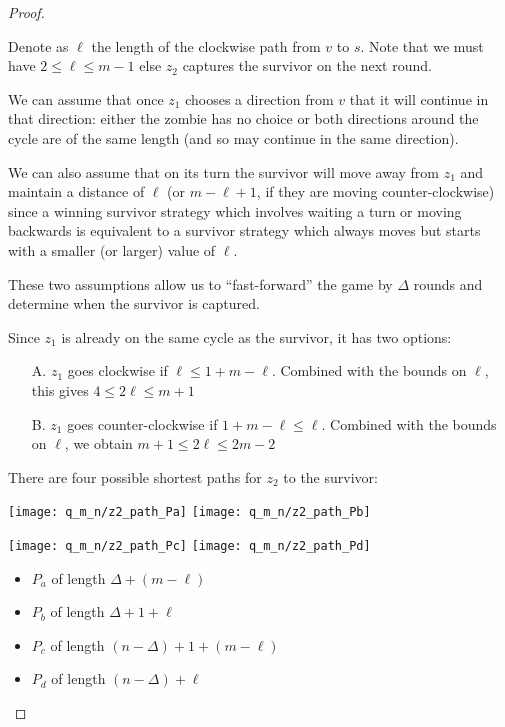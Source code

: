 \begin{proof}
\begin{proofpart}
  Denote as $\ell$ the length of the clockwise
  path from $v$ to $s$. Note that we must have $2 \leq \ell \leq m-1$ else
  $z_2$ captures the survivor on the next round.

  We can assume that once $z_1$ chooses a direction from $v$
  that it will continue in that direction:
  either the zombie has no choice or both directions around
  the cycle are of the same length (and so
  may continue in the same direction).

  We can also assume that on its turn the survivor will move away from
  $z_1$ and maintain a distance of $\ell$ (or $m-\ell +1$, if they are moving counter-clockwise)
  since a winning survivor strategy which involves waiting a turn
  or moving backwards is equivalent to a survivor strategy
  which always moves but starts with a smaller (or larger) value of $\ell$.

  These two assumptions allow us to ``fast-forward'' the game by $\Delta$ rounds
  and determine when the survivor is captured.

  Since $z_1$ is already on the same cycle as the survivor, it has two options:

  \begin{itemize}
   \item[A.] $z_1$ goes clockwise if $\ell \leq 1 + m - \ell$.
         Combined with the bounds on $\ell$, this gives $4 \leq 2 \ell \leq m + 1$

   \item[B.] $z_1$ goes counter-clockwise if $1 + m - \ell \leq \ell$.
         Combined with the bounds on $\ell$, we obtain $m + 1 \leq 2 \ell \leq 2m - 2$
  \end{itemize}

  There are four possible shortest paths for $z_2$ to the survivor:

  \begin{center}
    \texttt{[image: q\_m\_n/z2\_path\_Pa]}
    \texttt{[image: q\_m\_n/z2\_path\_Pb]}

    \texttt{[image: q\_m\_n/z2\_path\_Pc]}
    \texttt{[image: q\_m\_n/z2\_path\_Pd]}
  \end{center}

  \begin{itemize}
   \item $P_a$ of length $\Delta + (m - \ell)$
   \item $P_b$ of length $\Delta + 1 + \ell$
   \item $P_c$ of length $(n-\Delta) + 1 + (m-\ell)$
   \item $P_d$ of length $(n-\Delta) + \ell$
  \end{itemize}


\end{proofpart}
\end{proof}
